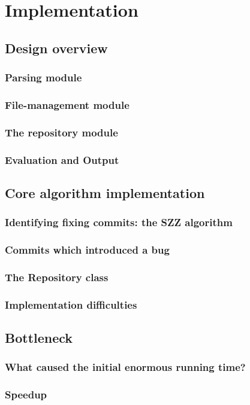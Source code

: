 \documentclass[12pt,twoside,notitlepage]{report}
\begin{document}
\cleardoublepage
\chapter{Implementation}
\section{Design overview}
\subsection{Parsing module}
\subsection{File-management module}
\subsection{The repository module}
\subsection{Evaluation and Output}
\section{Core algorithm implementation}
\subsection{Identifying fixing commits: the SZZ algorithm}
\subsection{Commits which introduced a bug}
\subsection{The Repository class}
\subsection{Implementation difficulties}
\section{Bottleneck}
\subsection{What caused the initial enormous running time?}
\subsection{Speedup}
\end{document}
